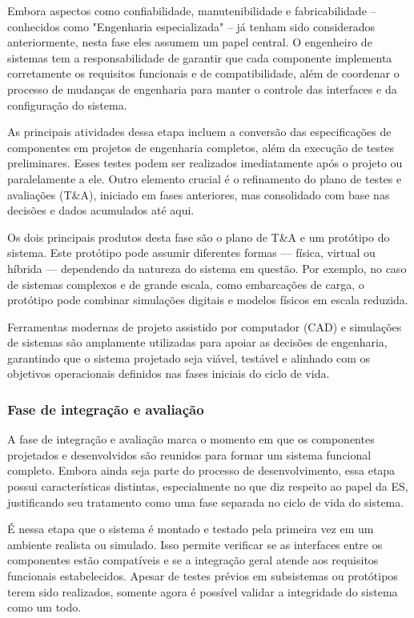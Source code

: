 	Embora aspectos como confiabilidade, manutenibilidade e fabricabilidade – conhecidos como "Engenharia especializada" – já tenham sido considerados anteriormente, 
	nesta fase eles assumem um papel central. O engenheiro de sistemas tem a responsabilidade de garantir que cada componente implementa corretamente os requisitos 
	funcionais e de compatibilidade, além de coordenar o processo de mudanças de engenharia para manter o controle das interfaces e da configuração do sistema.

	As principais atividades dessa etapa incluem a conversão das especificações de componentes em projetos de engenharia completos, além da execução de testes 
	preliminares. Esses testes podem ser realizados imediatamente após o projeto ou paralelamente a ele. Outro elemento crucial é o refinamento do plano de testes e 
	avaliações (T\&A), iniciado em fases anteriores, mas consolidado com base nas decisões e dados acumulados até aqui.

	Os dois principais produtos desta fase são o plano de T\&A e um protótipo do sistema. Este protótipo pode assumir diferentes formas — física, virtual ou híbrida — 
	dependendo da natureza do sistema em questão. Por exemplo, no caso de sistemas complexos e de grande escala, como embarcações de carga, o protótipo pode combinar
	simulações digitais e modelos físicos em escala reduzida.

	Ferramentas modernas de projeto assistido por computador (CAD) e simulações de sistemas são amplamente utilizadas para apoiar as decisões de engenharia, 
	garantindo que o sistema projetado seja viável, testável e alinhado com os objetivos operacionais definidos nas fases iniciais do ciclo de vida.

	\subsubsection*{Fase de integração e avaliação}
	A fase de integração e avaliação marca o momento em que os componentes projetados e desenvolvidos são reunidos para formar um sistema funcional completo. 
	Embora ainda seja parte do processo de desenvolvimento, essa etapa possui características distintas, especialmente no que diz respeito ao papel da ES, 
	justificando seu tratamento como uma fase separada no ciclo de vida do sistema.

	É nessa etapa que o sistema é montado e testado pela primeira vez em um ambiente realista ou simulado. Isso permite verificar se as interfaces entre os 
	componentes estão compatíveis e se a integração geral atende aos requisitos funcionais estabelecidos. Apesar de testes prévios em subsistemas ou protótipos 
	terem sido realizados, somente agora é possível validar a integridade do sistema como um todo.

